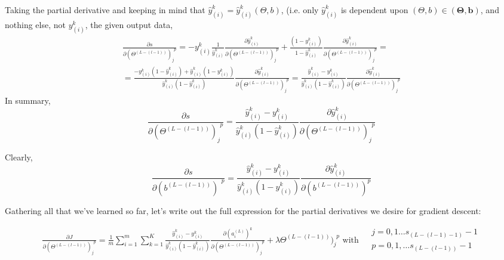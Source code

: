 \documentclass[10pt]{amsart}
\begin{document}
\begin{multicols*}{2}
Taking the partial derivative and keeping in mind that $\widehat{y}_{(i)}^k = \widehat{y}_{(i)}^k(\Theta,b)$, (i.e. only $\widehat{y}_{(i)}^k$ is dependent upon $(\Theta,b)\in (\mathbf{\Theta},\mathbf{b})$, and nothing else, not $y^k_{(i)}$, the given output data, 
\[
\begin{gathered}
\frac{\partial s}{ \partial (\Theta^{ (L-(l-1))})_j^{\  \  p} } = -y^k_{(i)} \frac{1}{ \widehat{y}_{(i)}^k  } \frac{\partial \widehat{y}_{(i)}^k }{ \partial ( \Theta^{(L-(l-1))})_j^{\  \  p } } +  \frac{ (1- y^k_{ (i)}) }{ 1- \widehat{y}_{(i)}^k } \frac{\partial \widehat{y}_{(i)}^k }{ \partial (\Theta^{(L-(l-1))})_j^{\  \  p} } = \\
= \frac{ - y^k_{(i)} (1- \widehat{y}^k_{(i)}) + \widehat{y}^k_{(i)} (1-y^k_{(i)}) }{ \widehat{y}^k_{(i)} ( 1 - \widehat{y}^k_{(i)}) } \frac{\partial \widehat{y}_{(i)}^k }{ \partial (\Theta^{(L-(l-1))})_j^{\  \  p} } = \frac{\widehat{y}_{(i)}^k - y_{(i)}^k }{ \widehat{y}_{(i)}^k (1 - \widehat{y}_{(i)}^k )} \frac{\partial \widehat{y}_{(i)}^k }{ \partial (\Theta^{(L-(l-1))})_j^{\  \  p} }
\end{gathered}
\] 
In summary, 
\begin{equation}
\frac{\partial s}{ \partial (\Theta^{ (L-(l-1))})_j^{\  \  p} } = \frac{\widehat{y}_{(i)}^k - y_{(i)}^k }{ \widehat{y}_{(i)}^k (1 - \widehat{y}_{(i)}^k )} \frac{\partial \widehat{y}_{(i)}^k }{ \partial (\Theta^{(L-(l-1))})_j^{\  \  p} }
\end{equation}


Clearly, 
\begin{equation}
\frac{\partial s}{ \partial (b^{ (L-(l-1))})^{\  \  p} } = \frac{\widehat{y}_{(i)}^k - y_{(i)}^k }{ \widehat{y}_{(i)}^k (1 - \widehat{y}_{(i)}^k )} \frac{\partial \widehat{y}_{(i)}^k }{ \partial ( b^{(L-(l-1))})^{ p} }
\end{equation}





Gathering all that we've learned so far, let's write out the full expression for the partial derivatives we desire for gradient descent:  

\begin{equation} %
	\begin{gathered}
	\frac{ \partial J }{ \partial ( \Theta^{(L-(l-1))})_j^{\  \  p} } = \frac{1}{m} \sum_{i=1}^m \sum_{k=1}^K  \frac{\widehat{y}_{(i)}^k - y_{(i)}^k }{ \widehat{y}_{(i)}^k (1 - \widehat{y}_{(i)}^k )}  \frac{ \partial (a_i^{(L)})^k }{ \partial (\Theta^{(L-(l-1))})_j^{\  \  p} } + \lambda  \Theta^{(L-(l-1))})_j^{\  \  p} \text{ with } \begin{aligned} & j = 0,1\dots s_{(L-(l-1)-1)}-1 \\ & p = 0,1,\dots s_{(L-(l-1))} -1 \end{aligned}
	\end{gathered}	
\end{equation}


\end{multicols*}
\end{document}
